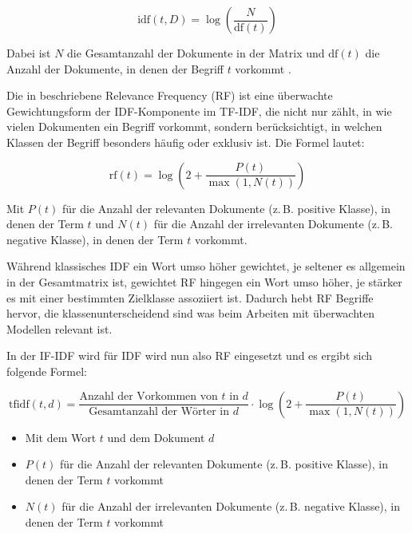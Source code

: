 \begin{equation}
    \text{idf}(t, D) = \log \left( \frac{N}{\text{df}(t)} \right)
\end{equation}

Dabei ist \( N \) die Gesamtanzahl der Dokumente in der Matrix und \( \text{df}(t) \) die Anzahl der Dokumente, 
in denen der Begriff \( t \) vorkommt \cite{qaiser2018}.

Die in \cite{Domenico2016} beschriebene Relevance Frequency (RF) ist eine überwachte Gewichtungsform der IDF-Komponente im TF-IDF, die nicht nur zählt, 
in wie vielen Dokumenten ein Begriff vorkommt, sondern berücksichtigt, in welchen Klassen der Begriff besonders häufig oder exklusiv ist.
Die Formel lautet:

\begin{equation}
    \text{rf}(t) = \log\left(2 + \frac{P(t)}{\max(1, N(t))} \right)
\end{equation}

Mit \( P(t) \) für die Anzahl der relevanten Dokumente (z.\,B. positive Klasse), in denen der Term \( t \)
und \( N(t) \) für die Anzahl der irrelevanten Dokumente (z.\,B. negative Klasse), in denen der Term \( t \) vorkommt.

Während klassisches IDF ein Wort umso höher gewichtet, je seltener es allgemein in der Gesamtmatrix ist,
gewichtet RF hingegen ein Wort umso höher, je stärker es mit einer bestimmten Zielklasse assoziiert ist.
Dadurch hebt RF Begriffe hervor, die klassenunterscheidend sind was beim Arbeiten mit überwachten Modellen relevant ist.

In der IF-IDF wird für IDF wird nun also RF eingesetzt und es ergibt sich folgende Formel:

\begin{equation}
    \text{tfidf}(t, d) = \frac{\text{Anzahl der Vorkommen von } t \text{ in } d}{\text{Gesamtanzahl der Wörter in } d} \cdot \log\left(2 + \frac{P(t)}{\max(1, N(t))} \right)
\end{equation}

\begin{itemize}
    \item Mit dem Wort \( t \) und dem Dokument \( d \) 
    \item \( P(t) \) für die Anzahl der relevanten Dokumente (z.\,B. positive Klasse), in denen der Term \( t \) vorkommt
    \item \( N(t) \) für die Anzahl der irrelevanten Dokumente (z.\,B. negative Klasse), in denen der Term \( t \) vorkommt
\end{itemize}

